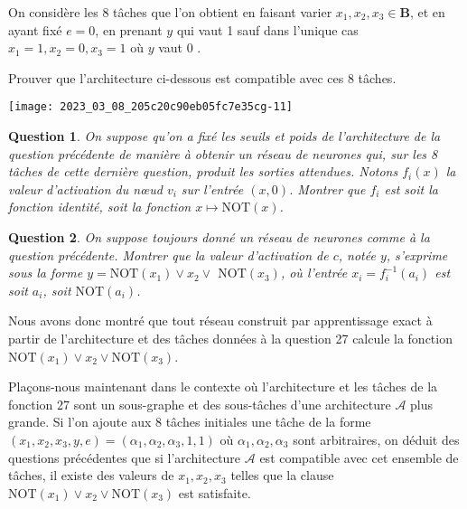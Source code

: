 \documentclass[10pt]{article}
\newtheorem{question}{Question}
\begin{document}
On considère les 8 tâches que l'on obtient en faisant varier $x_{1}, x_{2}, x_{3} \in \mathbf{B}$, et en ayant fixé $e=0$, en prenant $y$ qui vaut 1 sauf dans l'unique cas $x_{1}=1, x_{2}=0, x_{3}=1$ où $y$ vaut 0 .

Prouver que l'architecture ci-dessous est compatible avec ces 8 tâches.

\begin{center}
\texttt{[image: 2023\_03\_08\_205c20c90eb05fc7e35cg-11]}
\end{center}

\begin{question}
	On suppose qu'on a fixé les seuils et poids de l'architecture de la question précédente de manière à obtenir un réseau de neurones qui, sur les 8 tâches de cette dernière question, produit les sorties attendues. Notons $f_{i}(x)$ la valeur d'activation du nœud $v_{i}$ sur l'entrée $(x, 0)$. Montrer que $f_{i}$ est soit la fonction identité, soit la fonction $x \mapsto \mathrm{NOT}(x)$.
\end{question}

\begin{question}
	On suppose toujours donné un réseau de neurones comme à la question précédente. Montrer que la valeur d'activation de $c$, notée $y$, s'exprime sous la forme $y=\mathrm{NOT}\left(x_{1}\right) \vee x_{2} \vee$ $\mathrm{NOT}\left(x_{3}\right)$, où l'entrée $x_{i}=f_{i}^{-1}\left(a_{i}\right)$ est soit $a_{i}$, soit $\mathrm{NOT}\left(a_{i}\right)$.
\end{question}

Nous avons donc montré que tout réseau construit par apprentissage exact à partir de l'architecture et des tâches données à la question 27 calcule la fonction $\mathrm{NOT}\left(x_{1}\right) \vee x_{2} \vee \mathrm{NOT}\left(x_{3}\right)$.

Plaçons-nous maintenant dans le contexte où l'architecture et les tâches de la fonction 27 sont un sous-graphe et des sous-tâches d'une architecture $\mathcal{A}$ plus grande. Si l'on ajoute aux 8 tâches initiales une tâche de la forme $\left(x_{1}, x_{2}, x_{3}, y, e\right)=\left(\alpha_{1}, \alpha_{2}, \alpha_{3}, 1,1\right)$ où $\alpha_{1}, \alpha_{2}, \alpha_{3}$ sont arbitraires, on déduit des questions précédentes que si l'architecture $\mathcal{A}$ est compatible avec cet ensemble de tâches, il existe des valeurs de $x_{1}, x_{2}, x_{3}$ telles que la clause $\mathrm{NOT}\left(x_{1}\right) \vee x_{2} \vee \mathrm{NOT}\left(x_{3}\right)$ est satisfaite.
\end{document}
